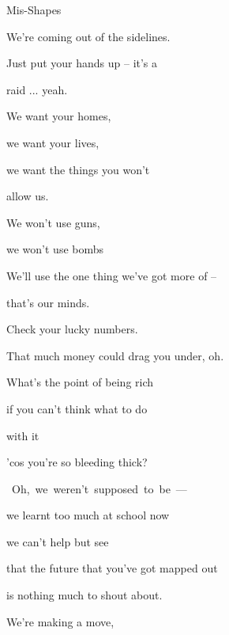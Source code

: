 \begin{song}{Mis-Shapes}{

    \chordset[Verse]{ \AMaj \EMaj \Fshm \DMaj \DSeven}

    \chordset[Chorus]{ \GMaj \GMajSeven \GSeven \CMaj \CMajSeven \CSeven }
	
	\chordset{ \Em \EmSix \EmaddC }

}
\begin{songchorus}
		We're coming out of the sidelines. 

		\quad Just put your hands up -- it's a 
		
		raid ... yeah.

		We want your homes,

		we want your lives,

		we want the things you won't 
		
		allow us. 

		We won't use guns, 

		we won't use bombs

		We'll use the one thing we've got more of --

		that's our minds.  \hspace{30pt}  \hspace{20pt} 

	\end{songchorus}

	\begin{songverse}

		 Check your lucky numbers.

		That much money could drag you under, oh. 

		What's the point of being rich 

		if you can't think what to do 
		
		with it 

		'cos you're so bleeding thick?

	\end{songverse}

	\begin{songverse}

		
		\mbox{ Oh, we weren't supposed to be ---} 

		we learnt too much at school now 

		 we can't help but see 

		that the future that you've got mapped out 

		is  nothing much to shout about. 

	\end{songverse}

	\begin{songchorus}

		
		 \quad We're making a move, 


\end{songchorus}
\end{song}
